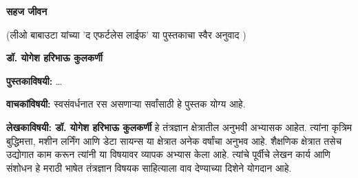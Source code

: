 \documentclass{article}
\begin{document}
\thispagestyle{empty}
\null\vfill

\begin{center}
{\fontsize{58}{78}\selectfont\color{titleorange}\textbf{सहज जीवन}}

\vspace{1em}

{\fontsize{12}{14}\selectfont\color{subtitleblue}(लीओ बाबाउटा यांच्या 'द एफर्टलेस लाईफ' या पुस्तकाचा स्वैर अनुवाद )}

\vspace{5em}

{\fontsize{16}{20}\selectfont\color{authorgreen}\textbf{डॉ. योगेश हरिभाऊ कुलकर्णी}}
\end{center}

\vfill\null
\clearpage

\thispagestyle{empty}
\vspace*{0.5in}

\noindent\textbf{पुस्तकाविषयी:} \ldots

\vspace{1.5em}

\noindent\textbf{वाचकांविषयी:} स्वसंवर्धनात रस असणाऱ्या सर्वांसाठी हे पुस्तक योग्य आहे.

\vspace{1.5em}

\noindent\textbf{लेखकाविषयी: डॉ. योगेश हरिभाऊ कुलकर्णी} हे तंत्रज्ञान क्षेत्रातील अनुभवी अभ्यासक आहेत. त्यांना कृत्रिम बुद्धिमत्ता, मशीन लर्निंग आणि डेटा सायन्स या क्षेत्रात अनेक वर्षांचा अनुभव आहे. शैक्षणिक क्षेत्रात तसेच उद्योगात काम करून त्यांनी या विषयावर व्यापक अभ्यास केला आहे. त्यांचे पूर्वीचे लेखन कार्य आणि संशोधन हे मराठी भाषेत तंत्रज्ञान विषयक साहित्याला वाव देण्याच्या दिशेने योगदान आहे.

\vfill
\end{document}
